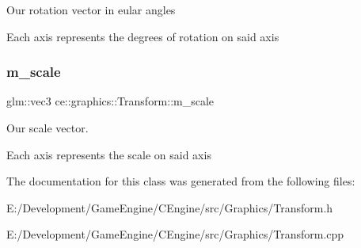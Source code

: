 Our rotation vector in eular angles

Each axis represents the degrees of rotation on said axis \mbox{\label{classce_1_1graphics_1_1_transform_a88394bb0517cf741b97f9c9c76d3775e}} 
\subsubsection{\texorpdfstring{m\+\_\+scale}{m\_scale}}
{\footnotesize\ttfamily glm\+::vec3 ce\+::graphics\+::\+Transform\+::m\+\_\+scale\hspace{0.3cm}{\ttfamily [protected]}}



Our scale vector. 

Each axis represents the scale on said axis 

The documentation for this class was generated from the following files\+:\begin{DoxyCompactItemize}
\item 
E\+:/\+Development/\+Game\+Engine/\+C\+Engine/src/\+Graphics/Transform.\+h\item 
E\+:/\+Development/\+Game\+Engine/\+C\+Engine/src/\+Graphics/Transform.\+cpp\end{DoxyCompactItemize}
